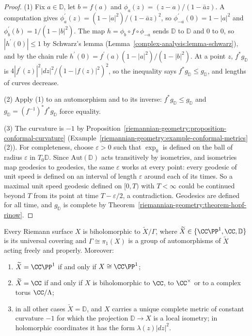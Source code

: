 \begin{proof}
(1) Fix $a \in \mathbb{D}$, let $b = f(a)$ and $\phi_a(z) = (z - a)/(1 - \bar az)$. A computation gives $\phi_a^{\prime}(z) = (1 - |a|^2)/(1 - \bar az)^2$, so
$\phi_{-a}^{\prime}(0) = 1 - |a|^2$ and $\phi_b^{\prime}(b) = 1/(1 - |b|^2)$. The map $h = \phi_b \circ f \circ \phi_{-a}$ sends $\mathbb{D}$ to $\mathbb{D}$ and $0$ to $0$, so
$|h^{\prime}(0)| \leq 1$ by Schwarz's lemma (Lemma~\ref{complex-analysis:lemma-schwarz}), and by the chain rule $h^{\prime}(0) = f^{\prime}(a)(1 - |a|^2)/(1 - |b|^2)$. At a point
$z$, $f^*g_{\mathbb{D}}$ is $4|f^{\prime}(z)|^2|dz|^2/(1 - |f(z)|^2)^2$, so the inequality says $f^*g_{\mathbb{D}} \leq g_{\mathbb{D}}$, and lengths of curves decrease.

(2) Apply (1) to an automorphism and to its inverse: $f^*g_{\mathbb{D}} \leq g_{\mathbb{D}}$ and $g_{\mathbb{D}} = (f^{-1})^*f^*g_{\mathbb{D}}$ force equality.

(3) The curvature is $-1$ by Proposition~\ref{riemannian-geometry:proposition-conformal-curvature} (Example~\ref{riemannian-geometry:example-conformal-metrics}(2)). For
completeness, choose $\varepsilon > 0$ such that $\exp_0$ is defined on the ball of radius $\varepsilon$ in $T_0\mathbb{D}$. Since $\mathrm{Aut}(\mathbb{D})$ acts transitively
by isometries, and isometries map geodesics to geodesics, the same $\varepsilon$ works at every point: every geodesic of unit speed is defined on an interval of length
$\varepsilon$ around each of its times. So a maximal unit speed geodesic defined on $[0, T)$ with $T < \infty$ could be continued beyond $T$ from its point at time
$T - \varepsilon/2$, a contradiction. Geodesics are defined for all time, and $g_{\mathbb{D}}$ is complete by Theorem~\ref{riemannian-geometry:theorem-hopf-rinow}.
\end{proof}

\begin{theorem}\label{complex-manifolds:theorem-riemann-surfaces-classification}
Every Riemann surface $X$ is biholomorphic to $\widetilde{X}/\Gamma$, where $\widetilde{X} \in \{\CC\PP^1, \CC, \mathbb{D}\}$ is its universal covering and $\Gamma \cong \pi_1(X)$ is
a group of automorphisms of $\widetilde{X}$ acting freely and properly. Moreover:
\begin{enumerate}
\item $\widetilde{X} = \CC\PP^1$ if and only if $X \cong \CC\PP^1$;
\item $\widetilde{X} = \CC$ if and only if $X$ is biholomorphic to $\CC$, to $\CC^\times$ or to a complex torus $\CC/\Lambda$;
\item in all other cases $\widetilde{X} = \mathbb{D}$, and $X$ carries a unique complete metric of constant curvature $-1$ for which the projection $\mathbb{D} \to X$ is a local
isometry; in holomorphic coordinates it has the form $\lambda(z)|dz|^2$.
\end{enumerate}
\end{theorem}

